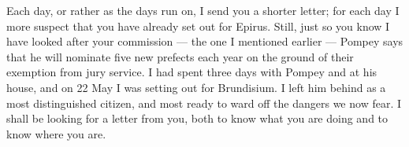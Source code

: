 

 Each day, or rather as the days run on, I send you a shorter letter; for each day I more suspect that you have already set out for Epirus. Still, just so you know I have looked after your commission --- the one I mentioned earlier --- Pompey says that he will nominate five new prefects each year on the ground of their exemption from jury service. I had spent three days with Pompey and at his house, and on 22 May I was setting out for Brundisium. I left him behind as a most distinguished citizen, and most ready to ward off the dangers we now fear. I shall be looking for a letter from you, both to know what you are doing and to know where you are.
